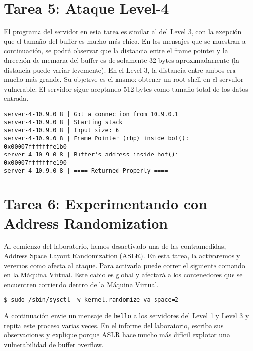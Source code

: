 \section{Tarea 5: Ataque Level-4} 

El programa del servidor en esta tarea es similar al del Level 3, con la exepción que el tamaño del buffer es mucho más chico. En los mensajes que se muestran a continuación, se podrá observar que la distancia entre el frame pointer y la dirección de memoria del buffer es de solamente 32 bytes aproximadamente (la distancia puede variar levemente).
En el Level 3, la distancia entre ambos era mucho más grande. Su objetivo es el mismo: obtener un root shell en el servidor vulnerable. El servidor sigue aceptando 512 bytes como tamaño total de los datos entrada.

\begin{lstlisting}
server-4-10.9.0.8 | Got a connection from 10.9.0.1
server-4-10.9.0.8 | Starting stack
server-4-10.9.0.8 | Input size: 6
server-4-10.9.0.8 | Frame Pointer (rbp) inside bof():  0x00007fffffffe1b0
server-4-10.9.0.8 | Buffer's address inside bof():     0x00007fffffffe190
server-4-10.9.0.8 | ==== Returned Properly ====
\end{lstlisting}
 

\section{Tarea 6: Experimentando con Address Randomization}

Al comienzo del laboratorio, hemos desactivado una de las contramedidas, Address Space Layout Randomization (ASLR). En esta tarea, la activaremos y veremos como afecta al ataque. Para activarla puede correr el siguiente comando en la Máquina Virtual. Este cabio es global y afectará a los contenedores que se encuentren corriendo dentro de la Máquina Virtual.


\begin{lstlisting}
$ sudo /sbin/sysctl -w kernel.randomize_va_space=2
\end{lstlisting}

A continuación envie un mensaje de \texttt{hello} a los servidores del Level 1 y Level 3 y repita este proceso varias veces.
En el informe del laboratorio, escriba sus observaciones y explique porque ASLR hace mucho más difícil explotar una vulnerabilidad de buffer overflow.


